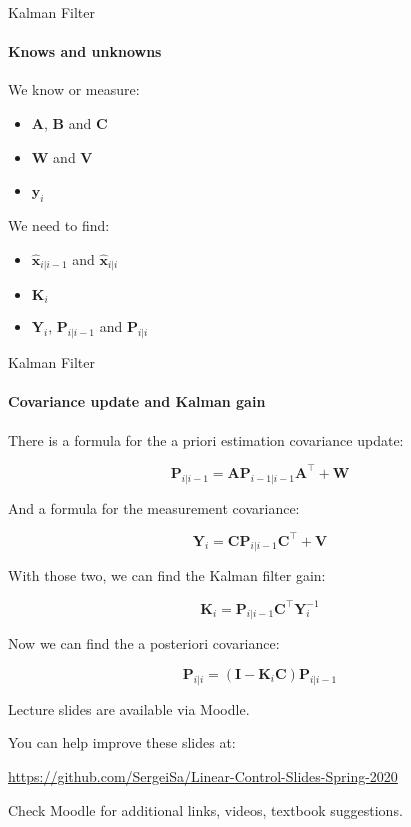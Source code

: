 \documentclass{beamer}
\begin{document}
\begin{frame}{Kalman Filter}
\framesubtitle{Knows and unknowns}
\begin{flushleft}

We know or measure:

\begin{itemize}
    \item $\mathbf A$, $\mathbf B$ and $\mathbf C$
    \item $\mathbf W$ and $\mathbf V$
    \item $\mathbf y_i$
\end{itemize}

\bigskip

We need to find:

\begin{itemize}
    \item $\hat{\mathbf x}_{i|i-1}$ and $\hat{\mathbf x}_{i|i}$
    \item $\mathbf K_i$
    \item $\mathbf Y_i$, $\mathbf P_{i|i-1}$ and $\mathbf P_{i|i}$
\end{itemize}


\end{flushleft}
\end{frame}



\begin{frame}{Kalman Filter}
\framesubtitle{Covariance update and Kalman gain}
\begin{flushleft}

There is a formula for the a priori estimation covariance update:

\[
\mathbf P_{i|i-1} = 
\mathbf A \mathbf P_{i-1|i-1} \mathbf A^{\top} + \mathbf W
\]

And a formula for the measurement covariance:

\[
\mathbf Y_i = 
\mathbf C \mathbf P_{i|i-1} \mathbf C^{\top} + \mathbf V
\]

With those two, we can find the Kalman filter gain:

\[
\mathbf K_i = 
\mathbf P_{i|i-1} \mathbf C^{\top} \mathbf Y_i^{-1}
\]

Now we can find the a posteriori covariance:

\[
\mathbf P_{i|i} = 
(\mathbf I - \mathbf K_i \mathbf C) \mathbf P_{i|i-1}
\]

\end{flushleft}
\end{frame}



\begin{frame}
\centerline{Lecture slides are available via Moodle.}
\bigskip
\centerline{You can help improve these slides at:}
\centerline{\url{https://github.com/SergeiSa/Linear-Control-Slides-Spring-2020}}
\bigskip
\centerline{Check Moodle for additional links, videos, textbook suggestions.}
\end{frame}
\end{document}
